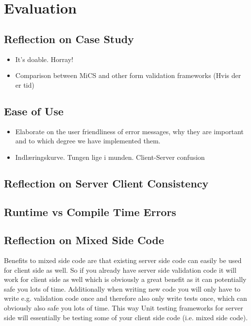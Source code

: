 \chapter{Evaluation}

\section{Reflection on Case Study} %
\label{sec:reflection_on_case_study}
	\begin{itemize}
		\item It's doable. Horray!
		\item Comparison between MiCS and other form validation frameworks (Hvis der er tid)
	\end{itemize}

\section{Ease of Use} %
\label{sec:ease_of_use}

	\begin{itemize}
		\item Elaborate on the user friendliness of error messages, why they are important
		and to which degree we have implemented them.
		\item Indlæringskurve. Tungen lige i munden. Client-Server confusion
	\end{itemize}



\section{Reflection on Server Client Consistency} %
\label{sec:reflection_on_server_client_consistency}


\section{Runtime vs Compile Time Errors} %
\label{sec:runtime_vs_compile_time_errors}


\section{Reflection on Mixed Side Code} %
\label{sec:reflection_on_mixed_side_code}
	Benefits to mixed side code are that existing server side code can easily be used for client side as well. So if you already have server side validation code it will work for client side as well which is obviously a great benefit as it can potentially safe you lots of time. Additionally when writing new code you will only have to write e.g. validation code once and therefore also only write tests once, which can obviously also safe you lots of time. This way Unit testing frameworks for server side will essentially be testing some of your client side code (i.e. mixed side code).

